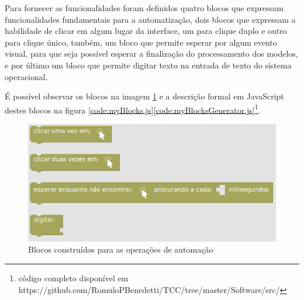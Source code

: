 \documentclass[tg]{mdtufsm}
\begin{document}
                Para fornecer as funcionalidades foram definidos quatro blocos que expressam funcionalidades fundamentais para a automatização, dois blocos que expressam a habilidade de clicar em algum lugar da interface, um para clique duplo e outro para clique único, também, um bloco que permite esperar por algum evento visual, para que seja possível esperar a finalização do processamento dos modelos, e por último um bloco que permite digitar texto na entrada de texto do sistema operacional.

                É possível observar os blocos na imagem \ref{fig:myblocks} e a descrição formal em JavaScript destes blocos na figura \ref{code:myBlocks.js}\ref{code:myBlocksGenerator.js}\footnote{código completo disponível em https://github.com/RomuloPBenedetti/TCC/tree/master/Software/src/}.

                \begin{figure}[!htb]
                    {\centering
                    \includegraphics[width=1.0\textwidth]{imagens/blocks.png}
                    \caption{Blocos construídos para as operações de automação}
                    \label{fig:myblocks}}
                \end{figure}
\end{document}
